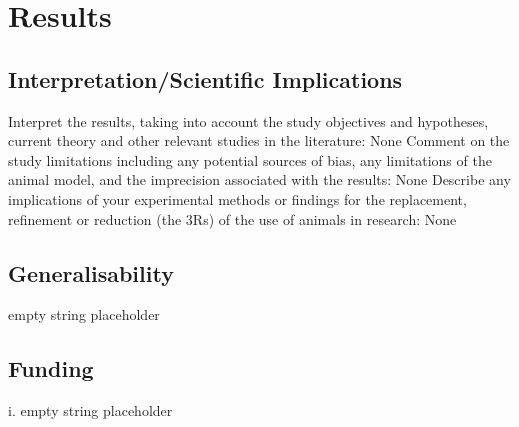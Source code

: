 \documentclass{article}%
\begin{document}
%
\section{Results}%
\label{sec:Results}%
\subsection{Interpretation/Scientific Implications}%
\label{subsec:Interpretation/Scientific Implications}%
Interpret the results, taking into account the study objectives and hypotheses, current theory and other relevant studies in the literature: None%
Comment on the study limitations including any potential sources of bias, any limitations of the animal model, and the imprecision associated with the results: None%
Describe any implications of your experimental methods or findings for the replacement, refinement or reduction (the 3Rs) of the use of animals in research: None

%
\subsection{Generalisability}%
\label{subsec:Generalisability}%
empty string placeholder

%
\subsection{Funding}%
\label{subsec:Funding}%
i. empty string placeholder

%
\end{document}
